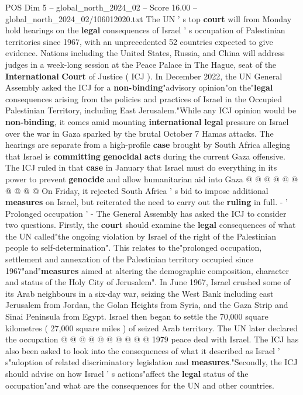 \begin{textsample}{POS Dim 5 – global\_north\_2024\_02 – Score 16.00 – global\_north\_2024\_02/106012020.txt}  \label{ex:f5_pos_239}
The UN ' s top \textbf{court} will from Monday hold hearings on the \textbf{legal} consequences of Israel ' s occupation of Palestinian territories since 1967, with an unprecedented 52 countries expected to give evidence.
Nations including the United States, Russia, and China will address judges in a week-long session at the Peace Palace in The Hague, seat of the \textbf{International} \textbf{Court} of Justice ( ICJ ).
In December 2022, the UN General Assembly asked the ICJ for a \textbf{non-binding}"advisory opinion"on the"\textbf{legal} consequences arising from the policies and practices of Israel in the Occupied Palestinian Territory, including East Jerusalem."While any ICJ opinion would be \textbf{non-binding}, it comes amid mounting \textbf{international} \textbf{legal} pressure on Israel over the war in Gaza sparked by the brutal October 7 Hamas attacks.
The hearings are separate from a high-profile \textbf{case} brought by South Africa alleging that Israel is \textbf{committing} \textbf{genocidal} \textbf{acts} during the current Gaza offensive.
The ICJ ruled in that \textbf{case} in January that Israel must do everything in its power to prevent \textbf{genocide} and allow humanitarian aid into Gaza @ @ @ @ @ @ @ @ @ @ On Friday, it rejected South Africa ' s bid to impose additional \textbf{measures} on Israel, but reiterated the need to carry out the \textbf{ruling} in full. - ' Prolonged occupation ' - The General Assembly has asked the ICJ to consider two questions.
Firstly, the \textbf{court} should examine the \textbf{legal} consequences of what the UN called"the ongoing violation by Israel of the right of the Palestinian people to self-determination".
This relates to the"prolonged occupation, settlement and annexation of the Palestinian territory occupied since 1967"and"\textbf{measures} aimed at altering the demographic composition, character and status of the Holy City of Jerusalem".
In June 1967, Israel crushed some of its Arab neighbours in a six-day war, seizing the West Bank including east Jerusalem from Jordan, the Golan Heights from Syria, and the Gaza Strip and Sinai Peninsula from Egypt.
Israel then began to settle the 70,000 square kilometres ( 27,000 square miles ) of seized Arab territory.
The UN later declared the occupation @ @ @ @ @ @ @ @ @ @ 1979 peace deal with Israel.
The ICJ has also been asked to look into the consequences of what it described as Israel ' s"adoption of related discriminatory legislation and \textbf{measures}."Secondly, the ICJ should advise on how Israel ' s actions"affect the \textbf{legal} status of the occupation"and what are the consequences for the UN and other countries.

\end{textsample}
